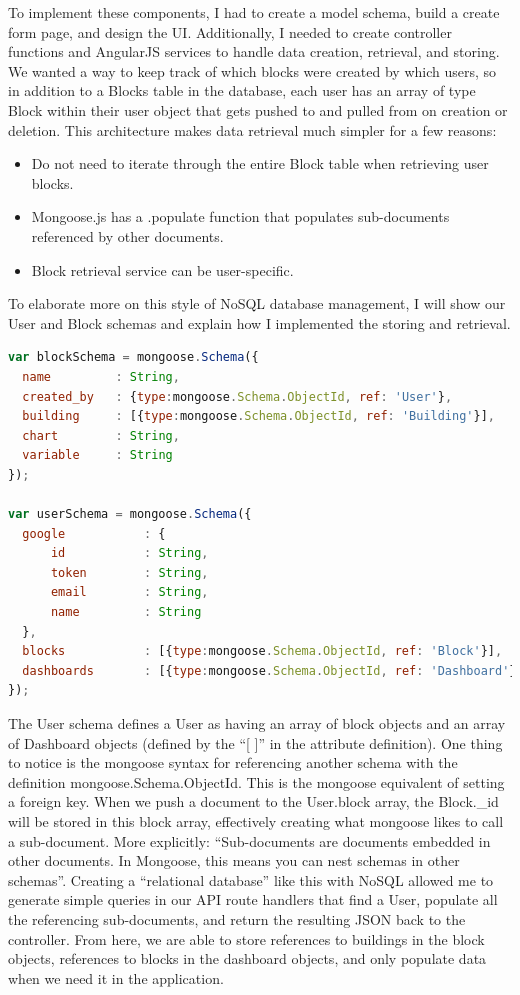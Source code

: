 \documentclass[letterpaper,10pt,serif,draftclsnofoot,onecolumn,compsoc,titlepage]{IEEEtran}
\begin{document}
\noindent To implement these components, I had to create a model schema, build a create form page, and design the UI. Additionally, I needed to create controller functions and AngularJS services to handle data creation, retrieval, and storing. We wanted a way to keep track of which blocks were created by which users, so in addition to a Blocks table in the database, each user has an array of type Block within their user object that gets pushed to and pulled from on creation or deletion. This architecture makes data retrieval much simpler for a few reasons:
\begin{itemize}
  \item Do not need to iterate through the entire Block table when retrieving user blocks.
  \item Mongoose.js has a .populate function that populates sub-documents referenced by other documents. 
  \item Block retrieval service can be user-specific.
\end{itemize}
To elaborate more on this style of NoSQL database management, I will show our User and Block schemas and explain how I implemented the storing and retrieval.
\begin{lstlisting}[language=JavaScript]
var blockSchema = mongoose.Schema({
  name         : String,
  created_by   : {type:mongoose.Schema.ObjectId, ref: 'User'},
  building     : [{type:mongoose.Schema.ObjectId, ref: 'Building'}],
  chart        : String,
  variable     : String
});

var userSchema = mongoose.Schema({
  google           : {
      id           : String,
      token        : String,
      email        : String,
      name         : String
  },
  blocks           : [{type:mongoose.Schema.ObjectId, ref: 'Block'}],
  dashboards       : [{type:mongoose.Schema.ObjectId, ref: 'Dashboard'}]
});
\end{lstlisting}
The User schema defines a User as having an array of block objects and an array of Dashboard objects (defined by the ``[ ]'' in the attribute definition). One thing to notice is the mongoose syntax for referencing another schema with the definition mongoose.Schema.ObjectId. This is the mongoose equivalent of setting a foreign key. When we push a document to the User.block array, the Block.\_id will be stored in this block array, effectively creating what mongoose likes to call a sub-document. More explicitly: ``Sub-documents are documents embedded in other documents. In Mongoose, this means you can nest schemas in other schemas''\cite{mongoose}. Creating a ``relational database'' like this with NoSQL allowed me to generate simple queries in our API route handlers that find a User, populate all the referencing sub-documents, and return the resulting JSON back to the controller. From here, we are able to store references to buildings in the block objects, references to blocks in the dashboard objects, and only populate data when we need it in the application. 
\end{document}

